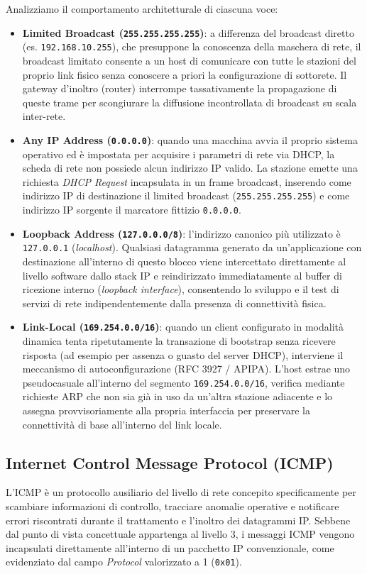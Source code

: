 \documentclass[11pt, a4paper]{article}
\begin{document}
Analizziamo il comportamento architetturale di ciascuna voce:
\begin{itemize}
    \item \textbf{Limited Broadcast (\texttt{255.255.255.255})}: a differenza del broadcast diretto (es. \texttt{192.168.10.255}), che presuppone la conoscenza della maschera di rete, il broadcast limitato consente a un host di comunicare con tutte le stazioni del proprio link fisico senza conoscere a priori la configurazione di sottorete. Il gateway d'inoltro (router) interrompe tassativamente la propagazione di queste trame per scongiurare la diffusione incontrollata di broadcast su scala inter-rete.
    \item \textbf{Any IP Address (\texttt{0.0.0.0})}: quando una macchina avvia il proprio sistema operativo ed è impostata per acquisire i parametri di rete via DHCP, la scheda di rete non possiede alcun indirizzo IP valido. La stazione emette una richiesta \emph{DHCP Request} incapsulata in un frame broadcast, inserendo come indirizzo IP di destinazione il limited broadcast (\texttt{255.255.255.255}) e come indirizzo IP sorgente il marcatore fittizio \texttt{0.0.0.0}.
    \item \textbf{Loopback Address (\texttt{127.0.0.0/8})}: l'indirizzo canonico più utilizzato è \texttt{127.0.0.1} (\emph{localhost}). Qualsiasi datagramma generato da un'applicazione con destinazione all'interno di questo blocco viene intercettato direttamente al livello software dallo stack IP e reindirizzato immediatamente al buffer di ricezione interno (\emph{loopback interface}), consentendo lo sviluppo e il test di servizi di rete indipendentemente dalla presenza di connettività fisica.
    \item \textbf{Link-Local (\texttt{169.254.0.0/16})}: quando un client configurato in modalità dinamica tenta ripetutamente la transazione di bootstrap senza ricevere risposta (ad esempio per assenza o guasto del server DHCP), interviene il meccanismo di autoconfigurazione (RFC 3927 / APIPA). L'host estrae uno pseudocasuale all'interno del segmento \texttt{169.254.0.0/16}, verifica mediante richieste ARP che non sia già in uso da un'altra stazione adiacente e lo assegna provvisoriamente alla propria interfaccia per preservare la connettività di base all'interno del link locale.
\end{itemize}

\subsection{Internet Control Message Protocol (ICMP)}
L'ICMP è un protocollo ausiliario del livello di rete concepito specificamente per scambiare informazioni di controllo, tracciare anomalie operative e notificare errori riscontrati durante il trattamento e l'inoltro dei datagrammi IP. Sebbene dal punto di vista concettuale appartenga al livello 3, i messaggi ICMP vengono incapsulati direttamente all'interno di un pacchetto IP convenzionale, come evidenziato dal campo \emph{Protocol} valorizzato a 1 (\texttt{0x01}).
\end{document}
